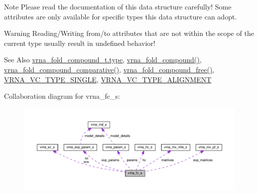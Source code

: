 \begin{DoxyNote}{Note}
Please read the documentation of this data structure carefully! Some attributes are only available for specific types this data structure can adopt.
\end{DoxyNote}
\begin{DoxyWarning}{Warning}
Reading/\-Writing from/to attributes that are not within the scope of the current type usually result in undefined behavior!
\end{DoxyWarning}
\begin{DoxySeeAlso}{See Also}
\hyperlink{group__fold__compound_ac5eab693deac9a1a40c2a95ac294707c}{vrna\-\_\-fold\-\_\-compound\-\_\-t.\-type}, \hyperlink{group__fold__compound_ga6601d994ba32b11511b36f68b08403be}{vrna\-\_\-fold\-\_\-compound()}, \hyperlink{group__fold__compound_gad6bacc816af274922b13d947f708aa0c}{vrna\-\_\-fold\-\_\-compound\-\_\-comparative()}, \hyperlink{group__fold__compound_gadded6039d63f5d6509836e20321534ad}{vrna\-\_\-fold\-\_\-compound\-\_\-free()}, \hyperlink{group__fold__compound_gga01a4ff86fa71deaaa5d1abbd95a1447da1608d3aa78905fc39e0d25a624ac9512}{V\-R\-N\-A\-\_\-\-V\-C\-\_\-\-T\-Y\-P\-E\-\_\-\-S\-I\-N\-G\-L\-E}, \hyperlink{group__fold__compound_gga01a4ff86fa71deaaa5d1abbd95a1447da056345f1bcfe7cd595d1fd437c05246d}{V\-R\-N\-A\-\_\-\-V\-C\-\_\-\-T\-Y\-P\-E\-\_\-\-A\-L\-I\-G\-N\-M\-E\-N\-T} 
\end{DoxySeeAlso}


Collaboration diagram for vrna\-\_\-fc\-\_\-s\-:
\nopagebreak
\begin{figure}[H]
\begin{center}
\leavevmode
\includegraphics[width=350pt]{structvrna__fc__s__coll__graph}
\end{center}
\end{figure}

